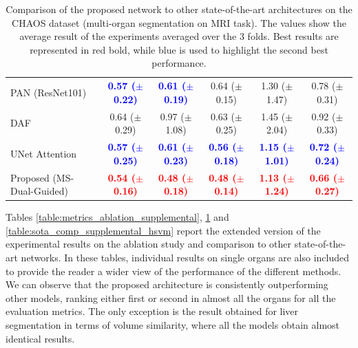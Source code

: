 \documentclass[journal]{IEEEtran}
\begin{document}
\begin{table}[t!]
\begin{tabular}{lcccc|c}
PAN (ResNet101) \cite{li2018pyramid}   & \textcolor{blue}{\textbf{0.57 ($\pm$0.22)}}  & \textcolor{blue}{\textbf{0.61 ($\pm$0.19)}} & 0.64 ($\pm$0.15) & 1.30 ($\pm$1.47) & 0.78 ($\pm$0.31) \\
DAF \cite{wang18d}  & 0.64 ($\pm$0.29) & 0.97 ($\pm$1.08) & 0.63 ($\pm$0.25)& 1.45 ($\pm$2.04)&  0.92 ($\pm$0.33)  \\
UNet Attention \cite{schlemper2019attention}  &   \textcolor{blue}{\textbf{0.57 ($\pm$0.25)}} & \textcolor{blue}{\textbf{0.61 ($\pm$0.23)}}&  \textcolor{blue}{\textbf{0.56 ($\pm$0.18)}} & \textcolor{blue}{\textbf{1.15 ($\pm$1.01)}}&  \textcolor{blue}{\textbf{0.72 ($\pm$0.24)}}   \\
Proposed (MS-Dual-Guided)  & \textcolor{red}{\textbf{0.54 ($\pm$0.16)}}  & \textcolor{red}{\textbf{0.48 ($\pm$0.18)}}&  \textcolor{red}{\textbf{0.48 ($\pm$0.14)}} & \textcolor{red}{\textbf{1.13 ($\pm$1.24)}} &  \textcolor{red}{\textbf{0.66 ($\pm$0.27)}} \\
\midrule
\midrule
\end{tabular}

\caption{Comparison of the proposed network to other state-of-the-art architectures on the CHAOS dataset (multi-organ segmentation on MRI task). The values show the average result of the experiments averaged over the 3 folds. Best results are represented in red bold, while blue is used to highlight the second best performance.}
\label{table:sota_comp_supplemental}
\end{table}

Tables \ref{table:metrics_ablation_supplemental}, \ref{table:sota_comp_supplemental} and \ref{table:sota_comp_supplemental_hsvm} report the extended version of the experimental results on the ablation study and comparison to other state-of-the-art networks. In these tables, individual results on single organs are also included to provide the reader a wider view of the performance of the different methods. We can observe that the proposed architecture is consistently outperforming other models, ranking either first or second in almost all the organs for all the evaluation metrics. The only exception is the result obtained for liver segmentation in terms of volume similarity, where all the models obtain almost identical results.


\end{document}
